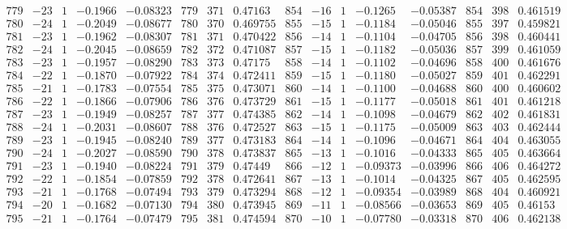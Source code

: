 \documentclass[11pt,reqno,a4letter]{article}
\numberwithin{figure}{section}
\numberwithin{table}{section}
\theoremstyle{plain}
\numberwithin{theorem}{section}
\theoremstyle{definition}
\begin{document}
\begin{table}[ht]
\begin{equation*}
{\begin{array}{ccccc|ccc|ccccc|ccc}
 779 & -23 & 1 & -0.1966 & -0.08323 & 779 & 371 & 0.47163 & 854 & -16 & 1 & -0.1265 & -0.05387 & 854 & 398 & 0.461519 \\
 780 & -24 & 1 & -0.2049 & -0.08677 & 780 & 370 & 0.469755 & 855 & -15 & 1 & -0.1184 & -0.05046 & 855 & 397 & 0.459821 \\
 781 & -23 & 1 & -0.1962 & -0.08307 & 781 & 371 & 0.470422 & 856 & -14 & 1 & -0.1104 & -0.04705 & 856 & 398 & 0.460441 \\
 782 & -24 & 1 & -0.2045 & -0.08659 & 782 & 372 & 0.471087 & 857 & -15 & 1 & -0.1182 & -0.05036 & 857 & 399 & 0.461059 \\
 783 & -23 & 1 & -0.1957 & -0.08290 & 783 & 373 & 0.47175 & 858 & -14 & 1 & -0.1102 & -0.04696 & 858 & 400 & 0.461676 \\
 784 & -22 & 1 & -0.1870 & -0.07922 & 784 & 374 & 0.472411 & 859 & -15 & 1 & -0.1180 & -0.05027 & 859 & 401 & 0.462291 \\
 785 & -21 & 1 & -0.1783 & -0.07554 & 785 & 375 & 0.473071 & 860 & -14 & 1 & -0.1100 & -0.04688 & 860 & 400 & 0.460602 \\
 786 & -22 & 1 & -0.1866 & -0.07906 & 786 & 376 & 0.473729 & 861 & -15 & 1 & -0.1177 & -0.05018 & 861 & 401 & 0.461218 \\
 787 & -23 & 1 & -0.1949 & -0.08257 & 787 & 377 & 0.474385 & 862 & -14 & 1 & -0.1098 & -0.04679 & 862 & 402 & 0.461831 \\
 788 & -24 & 1 & -0.2031 & -0.08607 & 788 & 376 & 0.472527 & 863 & -15 & 1 & -0.1175 & -0.05009 & 863 & 403 & 0.462444 \\
 789 & -23 & 1 & -0.1945 & -0.08240 & 789 & 377 & 0.473183 & 864 & -14 & 1 & -0.1096 & -0.04671 & 864 & 404 & 0.463055 \\
 790 & -24 & 1 & -0.2027 & -0.08590 & 790 & 378 & 0.473837 & 865 & -13 & 1 & -0.1016 & -0.04333 & 865 & 405 & 0.463664 \\
 791 & -23 & 1 & -0.1940 & -0.08224 & 791 & 379 & 0.47449 & 866 & -12 & 1 & -0.09373 & -0.03996 & 866 & 406 & 0.464272 \\
 792 & -22 & 1 & -0.1854 & -0.07859 & 792 & 378 & 0.472641 & 867 & -13 & 1 & -0.1014 & -0.04325 & 867 & 405 & 0.462595 \\
 793 & -21 & 1 & -0.1768 & -0.07494 & 793 & 379 & 0.473294 & 868 & -12 & 1 & -0.09354 & -0.03989 & 868 & 404 & 0.460921 \\
 794 & -20 & 1 & -0.1682 & -0.07130 & 794 & 380 & 0.473945 & 869 & -11 & 1 & -0.08566 & -0.03653 & 869 & 405 & 0.46153 \\
 795 & -21 & 1 & -0.1764 & -0.07479 & 795 & 381 & 0.474594 & 870 & -10 & 1 & -0.07780 & -0.03318 & 870 & 406 & 0.462138 \\

\end{array}}
\end{equation*}
\end{table}
\end{document}
